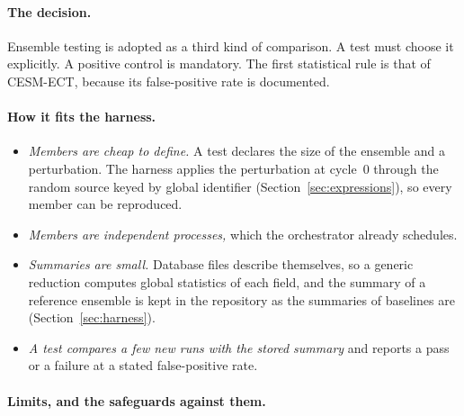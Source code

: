 \documentclass[11pt,a4paper]{article}
\begin{document}
\paragraph{The decision.}  Ensemble testing is adopted as a third kind of
comparison.  A test must choose it explicitly.  A positive control is
mandatory.  The first statistical rule is that of CESM-ECT, because its
false-positive rate is documented.

\paragraph{How it fits the harness.}

\begin{itemize}
  \item \emph{Members are cheap to define.}  A test declares the size of the
        ensemble and a perturbation.  The harness applies the perturbation
        at cycle~0 through the random source keyed by global identifier
        (Section~\ref{sec:expressions}), so every member can be reproduced.
  \item \emph{Members are independent processes,} which the orchestrator
        already schedules.
  \item \emph{Summaries are small.}  Database files describe themselves, so
        a generic reduction computes global statistics of each field, and
        the summary of a reference ensemble is kept in the repository as
        the summaries of baselines are (Section~\ref{sec:harness}).
  \item \emph{A test compares a few new runs with the stored summary} and
        reports a pass or a failure at a stated false-positive rate.
\end{itemize}

\paragraph{Limits, and the safeguards against them.}
\end{document}
